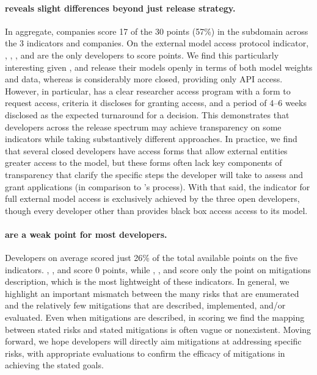 \documentclass[screen, authorversion, acmsmall]{acmart}
\begin{document}
\paragraph{\modelaccess reveals slight differences beyond just release strategy.}
In aggregate, companies score 17 of the 30 points (57\%) in the \modelaccess subdomain across the 3 indicators and \numcompanies companies.
On the external model access protocol indicator, \meta, \huggingface, \openai, and \stability are the only developers to score points.
We find this particularly interesting given \meta, \huggingface and \stability release their models openly in terms of both model weights and data, whereas \openai is considerably more closed, providing only API access.
However, in particular, \openai has a clear researcher access program with a form to request access, criteria it discloses for granting access, and a period of 4--6 weeks disclosed as the expected turnaround for a decision.
This demonstrates that developers across the release spectrum \citep{solaiman2023gradient} may achieve transparency on some indicators while taking substantively different approaches.
In practice, we find that several closed developers have access forms that allow external entities greater access to the model, but these forms often lack key components of transparency that clarify the specific steps the developer will take to assess and grant applications (\eg in comparison to \openai's process).
With that said, the indicator for full external model access is exclusively achieved by the three open developers, though every developer other than \inflection provides black box access access to its model.


\paragraph{\modelmitigations are a weak point for most developers.} 
Developers on average scored just 26\% of the total available points on the five \modelmitigations indicators. 
\huggingface, \stability, and \aitwentyone score 0 points, while \cohere, \inflection, and \amazon score only the point on mitigations description, which is the most lightweight of these indicators. 
In general, we highlight an important mismatch between the many risks that are enumerated and the relatively few mitigations that are described, implemented, and/or evaluated.
Even when mitigations are described, in scoring we find the mapping between stated risks and stated mitigations is often vague or nonexistent. 
Moving forward, we hope developers will directly aim mitigations at addressing specific risks, with appropriate evaluations to confirm the efficacy of mitigations in achieving the stated goals. 
\end{document}
